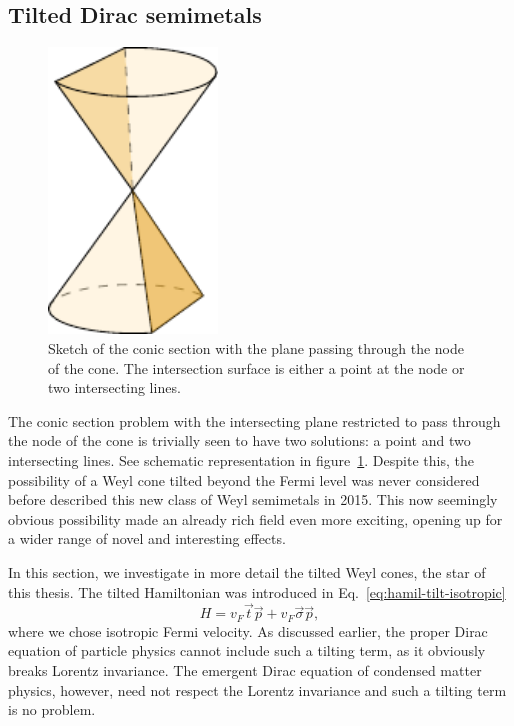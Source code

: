 \subsection{Tilted Dirac semimetals}
\label{sec:typeii}

\begin{figure}[ht]
  \centering
  \includegraphics[width=0.4\textwidth]{figures/conicSection}
  \caption{Sketch of the conic section with the plane passing through the node of the cone. The intersection surface is either a point at the node or two intersecting lines. \label{fig:conic-section-sketch}}
\end{figure}

The conic section problem with the intersecting plane restricted to pass through the node of the cone is trivially seen to have two solutions: a point and two intersecting lines.
See schematic representation in figure~\ref{fig:conic-section-sketch}.
Despite this, the possibility of a Weyl cone tilted beyond the Fermi level was never considered before \textcite{soluyanovTypeIIWeylSemimetals2015} described this new class of Weyl semimetals in 2015.
This now seemingly obvious possibility made an already rich field even more exciting, opening up for a wider range of novel and interesting effects.

In this section, we investigate in more detail the tilted Weyl cones, the star of this thesis.
The tilted Hamiltonian was introduced in Eq.~\eqref{eq:hamil-tilt-isotropic}
\[
H = v_F \vec{t} \vec{p} + v_F \vec{\sigma} \vec{p},
\]
where we chose isotropic Fermi velocity.
As discussed earlier, the proper Dirac equation of particle physics cannot include such a tilting term, as it obviously breaks Lorentz invariance.
The emergent Dirac equation of condensed matter physics, however, need not respect the Lorentz invariance and such a tilting term is no problem.

